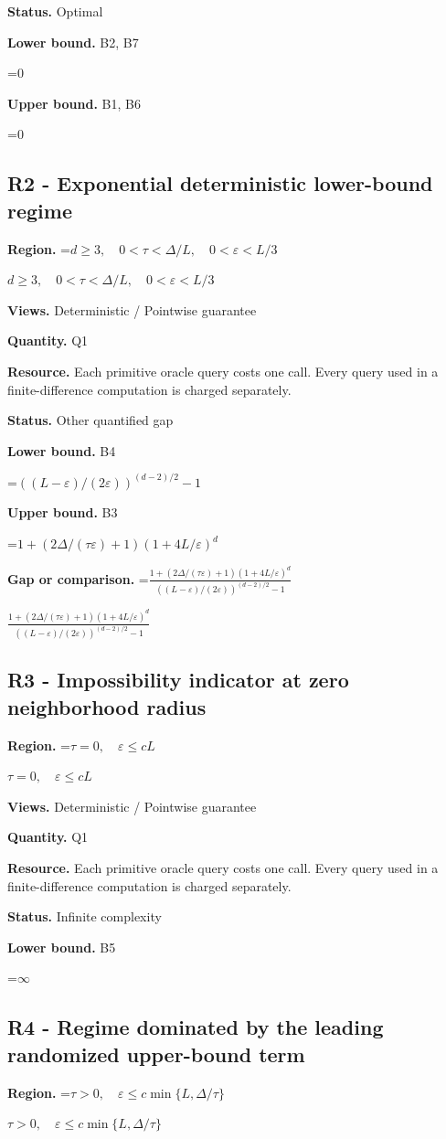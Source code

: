 \documentclass[10pt,a4paper]{article}
\newcommand{\AtlasMath}[1]{\par\begingroup\centering\setbox0=\hbox{$\displaystyle #1$}\ifdim\wd0>1.4\linewidth\typeout{ATLAS WIDE FORMULA: \the\wd0}\fi\ifdim\wd0>\linewidth\resizebox{\linewidth}{!}{\box0}\else\box0\fi\par\endgroup}
\newcommand{\AtlasInlineMath}[1]{\begingroup\setbox0=\hbox{$#1$}\ifdim\wd0>.4\linewidth\endgroup\AtlasMath{#1}\else\endgroup$#1$\fi}
\begin{document}
\textbf{Status.} Optimal

\textbf{Lower bound.} B2, B7

\AtlasMath{0}
\textbf{Upper bound.} B1, B6

\AtlasMath{0}
\subsection{R2 - Exponential deterministic lower-bound regime}
\textbf{Region.} \AtlasInlineMath{d\ge3,\quad0<\tau<\Delta/L,\quad0<\varepsilon<L/3}

\textbf{Views.} Deterministic / Pointwise guarantee

\textbf{Quantity.} Q1

\textbf{Resource.} Each primitive oracle query costs one call. Every query used in a finite-difference computation is charged separately.

\textbf{Status.} Other quantified gap

\textbf{Lower bound.} B4

\AtlasMath{((L-\varepsilon)/(2\varepsilon))^{(d-2)/2}-1}
\textbf{Upper bound.} B3

\AtlasMath{1+(2\Delta/(\tau\varepsilon)+1)(1+4L/\varepsilon)^d}
\textbf{Gap or comparison.} \AtlasInlineMath{\frac{1+(2\Delta/(\tau\varepsilon)+1)(1+4L/\varepsilon)^d}{((L-\varepsilon)/(2\varepsilon))^{(d-2)/2}-1}}

\subsection{R3 - Impossibility indicator at zero neighborhood radius}
\textbf{Region.} \AtlasInlineMath{\tau=0,\quad\varepsilon\le cL}

\textbf{Views.} Deterministic / Pointwise guarantee

\textbf{Quantity.} Q1

\textbf{Resource.} Each primitive oracle query costs one call. Every query used in a finite-difference computation is charged separately.

\textbf{Status.} Infinite complexity

\textbf{Lower bound.} B5

\AtlasMath{\infty}
\subsection{R4 - Regime dominated by the leading randomized upper-bound term}
\textbf{Region.} \AtlasInlineMath{\tau>0,\quad\varepsilon\le c\min\{L,\Delta/\tau\}}
\end{document}
